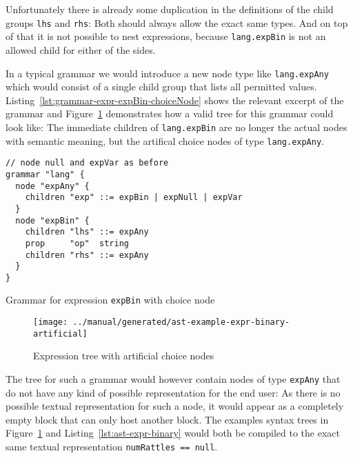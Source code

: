 \documentclass[sigconf,natbib=false,review=true,anonymous]{acmart}
\newcommand\astScale{0.7}
\begin{document}
Unfortunately there is already some duplication in the definitions of the child groups \texttt{lhs} and \texttt{rhs}: Both should always allow the exact same types. And on top of that it is not possible to nest expressions, because \texttt{lang.expBin} is not an allowed child for either of the sides.

In a typical grammar we would introduce a new node type like \texttt{lang.expAny} which would consist of a single child group that lists all permitted values. Listing~\ref{lst:grammar-expr-expBin-choiceNode} shows the relevant excerpt of the grammar and Figure~\ref{fig:ast-choice-node} demonstrates how a valid tree for this grammar could look like: The immediate children of \texttt{lang.expBin} are no longer the actual nodes with semantic meaning, but the artifical choice nodes of type \texttt{lang.expAny}.

\begin{listing}[H]
\begin{verbatim}
// node null and expVar as before
grammar "lang" {
  node "expAny" {
    children "exp" ::= expBin | expNull | expVar
  }
  node "expBin" {
    children "lhs" ::= expAny
    prop     "op"  string
    children "rhs" ::= expAny
  }
}
\end{verbatim}
\caption{Grammar for expression \texttt{expBin} with choice node}
\label{lst:grammar-expr-expBin-choiceNode}
\end{listing}

\begin{figure}
  \texttt{[image: ../manual/generated/ast-example-expr-binary-artificial]}
  \caption{Expression tree with artificial choice nodes}
  \label{fig:ast-choice-node}
\end{figure}

The tree for such a grammar would however contain nodes of type \texttt{expAny} that do not have any kind of possible representation for the end user: As there is no possible textual representation for such a node, it would appear as a completely empty block that can only host another block. The examples syntax trees in Figure~\ref{fig:ast-choice-node} and Listing~\ref{lst:ast-expr-binary} would both be compiled to the exact same textual representation \texttt{numRattles == null}.
\end{document}
